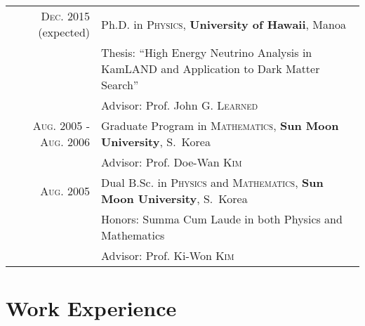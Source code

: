 \documentclass[a4paper,10pt]{article} %
\begin{document}
\begin{tabular}{rp{10.3cm}}	
	\textsc{Dec.} 2015 (expected) & Ph.D. in \textsc{Physics},
	\textbf{University of Hawaii}, Manoa\\
	& \small Thesis: ``High Energy Neutrino Analysis in KamLAND and Application
	to Dark Matter Search''\\
	& \small Advisor: Prof. John G. \textsc{Learned}\\


	\textsc{Aug.} 2005 - \textsc{Aug.} 2006 & Graduate Program in
	\textsc{Mathematics}, \normalsize\textbf{Sun Moon University}, S.~Korea\\
	& \small Advisor: Prof. Doe-Wan \textsc{Kim}\\


	\textsc{Aug.} 2005 & Dual B.Sc. in \textsc{Physics} and
	\textsc{Mathematics}, \textbf{Sun Moon University}, S.~Korea\\
	& \small Honors: Summa Cum Laude in both Physics and Mathematics\\
	& \small Advisor: Prof. Ki-Won \textsc{Kim}\\


\end{tabular}


\section{Work Experience}
\end{document}

